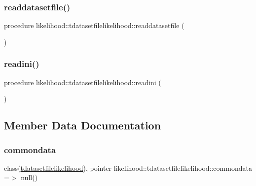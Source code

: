\subsubsection{\texorpdfstring{readdatasetfile()}{readdatasetfile()}}
{\footnotesize\ttfamily procedure likelihood\+::tdatasetfilelikelihood\+::readdatasetfile (\begin{DoxyParamCaption}{ }\end{DoxyParamCaption})\hspace{0.3cm}{\ttfamily [private]}}

\mbox{\label{structlikelihood_1_1tdatasetfilelikelihood_a2333447f4d2cca95f4bc6a323727e7e9}} 
\subsubsection{\texorpdfstring{readini()}{readini()}}
{\footnotesize\ttfamily procedure likelihood\+::tdatasetfilelikelihood\+::readini (\begin{DoxyParamCaption}{ }\end{DoxyParamCaption})\hspace{0.3cm}{\ttfamily [private]}}



\subsection{Member Data Documentation}
\mbox{\label{structlikelihood_1_1tdatasetfilelikelihood_a2e415cd4d075722104142f24cb7e617e}} 
\subsubsection{\texorpdfstring{commondata}{commondata}}
{\footnotesize\ttfamily class(\mbox{\hyperlink{structlikelihood_1_1tdatasetfilelikelihood}{tdatasetfilelikelihood}}), pointer likelihood\+::tdatasetfilelikelihood\+::commondata =$>$ null()\hspace{0.3cm}{\ttfamily [private]}}

